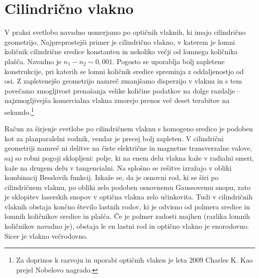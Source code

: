 \section{Cilindrično vlakno}
\label{chap:Cilinder}
V praksi svetlobo navadno usmerjamo po optičnih vlaknih, ki imajo cilindrično geometrijo.
Najpreprostejši primer je cilindrično vlakno, v katerem je lomni količnik cilindrične
sredice konstanten in nekoliko večji od lomnega količnika plašča. Navadno je 
$n_1 - n_2 \sim 0,001$. Pogosto se uporablja
bolj zapletene konstrukcije, pri katerih se lomni količnik sredice spreminja z
oddaljenostjo od osi. Z zapletenejšo geometrijo namreč zmanjšamo disperzijo v vlaknu in s tem
povečamo zmogljivost prenašanja velike količine podatkov na dolge razdalje -- 
najzmogljivejša komercialna vlakna zmorejo prenos več deset terabitov na 
sekundo.\footnote{Za doprinos k razvoju in uporabi optičnih vlaken je leta 2009 Charles
K. Kao prejel Nobelovo nagrado.}

Račun za širjenje svetlobe po cilindričnem vlaknu s homogeno sredico
je podoben kot za planparalelni vodnik, vendar je precej bolj
zapleten. V cilindrični geometriji namreč ni delitve na čiste električne in 
magnetne transverzalne valove, saj so robni pogoji sklopljeni: polje, ki na enem delu
vlakna kaže v radialni smeri, kaže na drugem delu v tangencialni. Na splošno se rešitve izražajo 
v obliki kombinacij Besslovih funkcij. Izkaže se, da je osnovni rod, ki se  širi po
cilindričnem vlaknu, po obliki zelo podoben osnovnemu Gaussovemu snopu, zato je sklopitev
laserskih snopov v optična vlakna zelo učinkovita. Tudi v cilindričnih vlaknih 
obstaja končno število lastnih rodov, ki je odvisno od polmera sredice in
lomnih količnikov sredice in plašča. Če je polmer zadosti majhen (razlika lomnih
količnikov navadno je), obstaja le en lastni rod in optično vlakno je 
enorodovno. Sicer je vlakno večrodovno.

